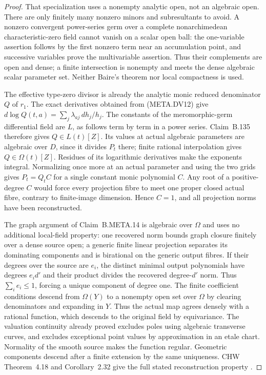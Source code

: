 \begin{proof}
That specialization uses a nonempty analytic open,
not an algebraic open.
There are only finitely many nonzero minors and
subresultants to avoid.
A nonzero convergent power-series germ over a
complete nonarchimedean characteristic-zero field
cannot vanish on a scalar open ball: the
one-variable assertion follows by the first
nonzero term near an accumulation point, and
successive variables prove the multivariable
assertion.
Thus their complements are open and dense; a
finite intersection is nonempty and meets the
dense algebraic scalar parameter set.
Neither Baire's theorem nor local compactness
is used.

The effective type-zero divisor is already the
analytic monic reduced denominator $Q$ of $r_1$.
The exact derivatives obtained from (META.DV12)
give
$d\log Q(t,a)=\sum_j\lambda_{aj}\,dh_j/h_j$.
The constants of the meromorphic-germ differential
field are $L$, as follows term by term in a
power series.
Claim~B.135 therefore gives $Q\in L(t)[Z]$.
Its values at actual algebraic parameters are
algebraic over $D$, since it divides $P_t$ there;
finite rational interpolation gives
$Q\in\Omega(t)[Z]$.
Residues of its logarithmic derivatives make the
exponents integral.
Normalizing once more at an actual parameter
and using the two grids gives $P_t=Q_tC$ for a
single constant monic polynomial $C$.
Any root of a positive-degree $C$ would force
every projection fibre to meet one proper closed
actual fibre, contrary to finite-image dimension.
Hence $C=1$, and all projection norms have been
reconstructed.

The graph argument of Claim~B.META.14 is algebraic
over $\Omega$ and uses no additional local-field
property: one recovered norm bounds graph closure
finitely over a dense source open; a generic finite
linear projection separates its dominating
components and is birational on the generic
output fibres.
If their degrees over the source are $e_i$, the
distinct minimal output polynomials have degrees
$e_i d'$ and their product divides the recovered
degree-$d'$ norm.  Thus $\sum_i e_i\le1$, forcing
a unique component of degree one.
The finite coefficient conditions descend from
$\Omega(Y)$ to a nonempty open set over $\Omega$
by clearing denominators and expanding in $Y$.
Thus the actual map agrees densely with a rational
function, which descends to the original field
by equivariance.
The valuation continuity already proved excludes
poles using algebraic transverse curves, and
excludes exceptional point values by approximation
in an etale chart.
Normality of the smooth source makes the function
regular.
Geometric components descend after a finite
extension by the same uniqueness.
CHW Theorem~4.18 and Corollary~2.32 give the full
stated reconstruction property
\citep{AN_CHW2024}.


\end{proof}
